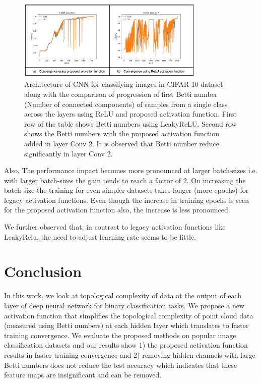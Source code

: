 \documentclass[wcp]{jmlr}
\begin{document}
\begin{figure}[htp]
\begin{center}
\includegraphics[width=0.8\textwidth]{images/training_convergence.png}
\caption{Architecture of CNN for classifying images in CIFAR-10 dataset along with the comparison  of progression of first Betti number (Number of connected components) of samples from a single class across the layers using ReLU  and proposed activation function. First row of the table shows Betti numbers using LeakyReLU. Second row shows the Betti numbers with the proposed activation function added in layer Conv 2. It is observed that Betti number reduce significantly in layer Conv 2.}
\label{fig:training_convergence}
\end{center}
\end{figure}

Also, The performance impact becomes more pronounced at larger batch-sizes i.e. with larger batch-sizes the gain tends to reach a factor of 2. On increasing the batch size the training for even simpler datasets takes longer (more epochs) for legacy activation functions. Even though the increase in training epochs  is seen for the proposed activation function also, the increase is less pronounced.

We further observed that,  in contrast to legacy activation functions like LeakyRelu,  the need to adjust learning rate seems to be little.

\section{Conclusion}
In this work, we look at topological complexity of data at the output of each layer of deep neural network for binary classification tasks. We propose a new activation function that simplifies the topological complexity of point cloud data (measured using Betti numbers)  at each hidden layer which translates to faster training convergence. We evaluate the proposed methods on popular image classification datasets and our results show 1) the proposed activation function results in faster training convergence and 2) removing hidden channels with large Betti numbers does not reduce the test accuracy which indicates that these feature maps are insignificant and can be removed.
\end{document}
